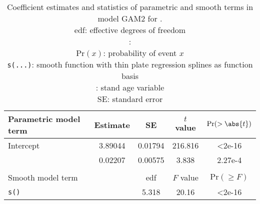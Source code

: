 \begin{singlespace}
  \begin{table}[h]
    \caption{Coefficient estimates and statistics of parametric and smooth terms in model GAM2 for \Spruce{}. \\
      edf: effective degrees of freedom \\
      \texttt{\ProductivityIndexVariableR{}}: \ProductivityIndexVariableText{} \\
      \(\text{Pr}(x)\): probability of event \(x\) \\
      \texttt{s(...)}: smooth function with thin plate regression splines as function basis \\
      \texttt{\StandAgeVariableR{}}: stand age variable \\
      SE: standard error}
    \label{tab:StatisticsGAM1Beech}
    {\tabulinesep=2mm
      \begin{tabu}{L
          S[table-format = 1.6]
          S[table-format = 1.6]
          S[table-format = 3.2]
          S[table-format = 1.2e-2, table-comparator = true]
        }
        \toprule
        Parametric model term & {Estimate} & {SE} & {\(t\) value} & {\(\text{Pr}(> \abs{t})\)} \\
        \midrule
        Intercept & 3.89044 & 0.01794 & 216.816 & <2e-16 \\
        \texttt{\ProductivityIndexVariableR{}} & 0.02207 & 0.00575 & 3.838 & 2.27e-4 \\
        \\
        Smooth model term &  & {edf} & {\(F\) value} & {\(\text{Pr}(\geq F)\)} \\
        \midrule
        \texttt{s(\StandAgeVariableR{})} & & 5.318 & 20.16 & <2e-16 \\
        \bottomrule
      \end{tabu}
    }
  \end{table}
\end{singlespace}



\clearpage{}

